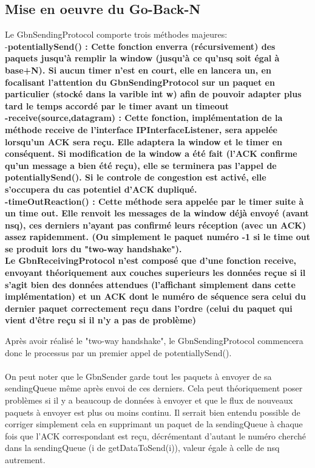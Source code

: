 \documentclass[11pt]{article}
\begin{document}
\subsection{Mise en oeuvre du Go-Back-N}
Le GbnSendingProtocol comporte trois méthodes majeures: \\
-\bfseries potentiallySend() \mdseries : Cette fonction enverra (récursivement) des paquets jusqu'à remplir la window (jusqu'à ce qu'nsq soit égal à base+N). Si aucun timer n'est en court, elle en lancera un, en focalisant l'attention du GbnSendingProtocol sur un paquet en particulier (stocké dans la varible int w) afin de pouvoir adapter plus tard le temps accordé par le timer avant un timeout \\
-\bfseries receive(source,datagram) \mdseries : Cette fonction, implémentation de la méthode receive de l'interface IPInterfaceListener, sera appelée lorsqu'un ACK sera reçu. Elle adaptera la window et le timer en conséquent. Si modification de la window a été fait (l'ACK confirme qu'un message a bien été reçu), elle se terminera pas l'appel de potentiallySend(). Si le controle de congestion est activé, elle s'occupera du cas potentiel d'ACK dupliqué. \\
-\bfseries timeOutReaction() \mdseries : Cette méthode sera appelée par le timer suite à un time out. Elle renvoit les messages de la window déjà envoyé (avant nsq), ces derniers n'ayant pas confirmé leurs réception (avec un ACK) assez rapidemment. (Ou simplement le paquet numéro -1 si le time out se produit lors du "two-way handshake").\\

Le GbnReceivingProtocol n'est composé que d'une fonction receive, envoyant théoriquement aux couches superieurs les données reçue si il s'agit bien des données attendues (l'affichant simplement dans cette implémentation) et un ACK dont le numéro de séquence sera celui du dernier paquet correctement reçu dans l'ordre (celui du paquet qui vient d'être reçu si il n'y a pas de problème)

Après avoir réalisé le "two-way handshake", le GbnSendingProtocol commencera donc le processus par un premier appel de potentiallySend(). \\ \\
On peut noter que le GbnSender garde tout les paquets à envoyer de sa sendingQueue même après envoi de ces derniers. Cela peut théoriquement poser problèmes si il y a beaucoup de données à envoyer et que le flux de nouveaux paquets à envoyer est plus ou moins continu. Il serrait bien entendu possible de corriger simplement cela en supprimant un paquet de la sendingQueue à chaque fois que l'ACK correspondant est reçu, décrémentant d'autant le numéro cherché dans la sendingQueue (i de getDataToSend(i)), valeur égale à celle de nsq autrement.
\end{document}
